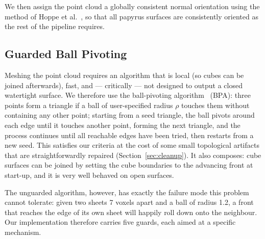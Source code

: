 We then assign the point cloud a globally consistent normal orientation using the method of Hoppe et al.~, so that all papyrus surfaces are consistently oriented as the rest of the pipeline requires.

\subsection{Guarded Ball Pivoting}
\label{sec:bpa}

Meshing the point cloud requires an algorithm that is local (so cubes can be joined afterwards), fast, and --- critically --- not designed to output a closed watertight surface. We therefore use the ball-pivoting algorithm~\cite{bernardini1999ball} (BPA): three points form a triangle if a ball of user-specified radius $\rho$ touches them without containing any other point; starting from a seed triangle, the ball pivots around each edge until it touches another point, forming the next triangle, and the process continues until all reachable edges have been tried, then restarts from a new seed. This satisfies our criteria at the cost of some small topological artifacts that are straightforwardly repaired (Section~\ref{sec:cleanup}). It also composes: cube surfaces can be joined by setting the cube boundaries to the advancing front at start-up, and it is very well behaved on open surfaces.

The unguarded algorithm, however, has exactly the failure mode this problem cannot tolerate: given two sheets 7 voxels apart and a ball of radius 1.2, a front that reaches the edge of its own sheet will happily roll down onto the neighbour. Our implementation therefore carries five guards, each aimed at a specific mechanism.

